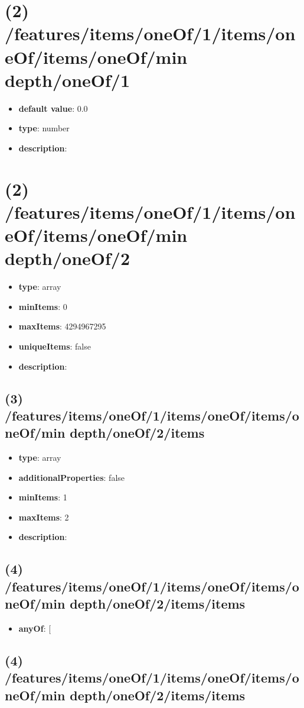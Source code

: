 \section{(2) /features/items/oneOf/1/items/oneOf/items/oneOf/min depth/oneOf/1}
\begin{itemize}[leftmargin=2em]\item {\bf default value}: 0.0
\item {\bf type}: number
\item {\bf description}: 
\end{itemize}\section{(2) /features/items/oneOf/1/items/oneOf/items/oneOf/min depth/oneOf/2}
\begin{itemize}[leftmargin=2em]\item {\bf type}: array
\item {\bf minItems}: 0
\item {\bf maxItems}: 4294967295
\item {\bf uniqueItems}: false
\item {\bf description}: 
\end{itemize}\subsection{(3) /features/items/oneOf/1/items/oneOf/items/oneOf/min depth/oneOf/2/items}
\begin{itemize}[leftmargin=3em]\item {\bf type}: array
\item {\bf additionalProperties}: false
\item {\bf minItems}: 1
\item {\bf maxItems}: 2
\item {\bf description}: 
\end{itemize}\subsection{(4) /features/items/oneOf/1/items/oneOf/items/oneOf/min depth/oneOf/2/items/items}
\begin{itemize}[leftmargin=4em]\item {\bf anyOf}: [\end{itemize}\subsection{(4) /features/items/oneOf/1/items/oneOf/items/oneOf/min depth/oneOf/2/items/items}

